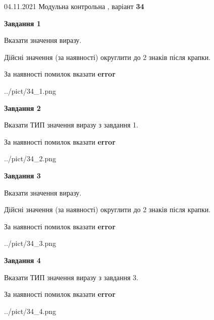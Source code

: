 \documentclass[11pt, ukrainian]{article}
\begin{document}
{04.11.2021 Модульна контрольна , варіант  \No \textbf { 34 }\par}
{
\begin {large}
{\begin {center}\textbf{Завдання 1}\end {center}}\par
Вказати значення виразу. \par
Дійсні значення (за наявності) округлити до 2 знаків після крапки. \par
За наявності помилок вказати \textbf{error}

\begin{center}
	{../pict/34_1.png}
\end{center}
\newpage

{\begin {center}\textbf{Завдання 2}\end {center}}\par
Вказати ТИП значення виразу з завдання 1. \par
За наявності помилок вказати \textbf{error}

\begin{center}
	{../pict/34_2.png}
\end{center}
\newpage

{\begin {center}\textbf{Завдання 3}\end {center}}\par
Вказати значення виразу. \par
Дійсні значення (за наявності) округлити до 2 знаків після крапки. \par
За наявності помилок вказати \textbf{error}

\begin{center}
	{../pict/34_3.png}
\end{center}
\newpage

{\begin {center}\textbf{Завдання 4}\end {center}}\par
Вказати ТИП значення виразу з завдання 3. \par
За наявності помилок вказати \textbf{error}

\begin{center}
	{../pict/34_4.png}
\end{center}
\newpage


\end{large}}
\end{document}
